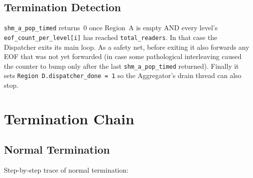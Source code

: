 \documentclass[11pt,a4paper]{article}
\newcommand{\code}[1]{\texttt{\small #1}}
\begin{document}
\subsection{Termination Detection}

\code{shm\_a\_pop\_timed} returns~0 once Region~A is empty AND every
level's \code{eof\_count\_per\_level[i]} has reached
\code{total\_readers}. In that case the Dispatcher exits its main loop.
As a safety net, before exiting it also forwards any EOF that was not
yet forwarded (in case some pathological interleaving caused the
counter to bump only after the last \code{shm\_a\_pop\_timed} returned).
Finally it sets \code{Region D.dispatcher\_done = 1} so the Aggregator's
drain thread can also stop.

\section{Termination Chain}

\subsection{Normal Termination}

Step-by-step trace of normal termination:
\end{document}
